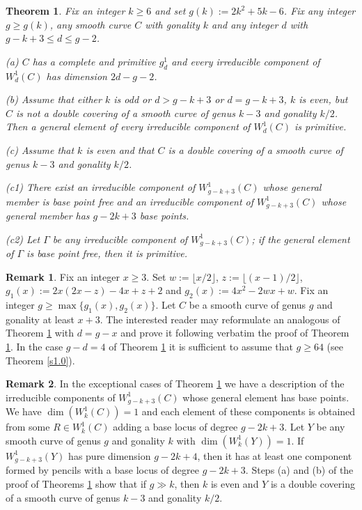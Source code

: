 \documentclass{amsart}
\theoremstyle{plain}
\newtheorem{theorem}{Theorem}
\theoremstyle{definition}
\newtheorem{remark}{Remark}
\begin{document}
\begin{theorem}\label{or1}
Fix an integer $k\ge 6$ and set $g(k):=2k^2+5k-6$. Fix any integer $g\ge g(k)$, any smooth curve $C$ with gonality $k$
and any integer $d$ with $g-k+3 \le d\le g-2$.

\quad (a) $C$ has a complete and primitive $g^1_d$ and every irreducible component of $W^1_d({C})$ has dimension $2d-g-2$.

\quad (b) Assume that either $k$ is odd or $d>g-k+3$ or $d=g-k+3$, $k$ is even, but $C$ is not a double covering of a smooth curve of genus $k-3$ and gonality $k/2$.
Then a general element of every irreducible component of $W^1_d({C})$ is primitive.


\quad ({c}) Assume that $k$ is even and that $C$ is a double covering of a smooth curve of genus $k-3$ and
gonality $k/2$.

\quad (c1) There exist an irreducible component of $W^1_{g-k+3}({C})$ whose general member
is base point free and an irreducible component of $W^1_{g-k+3}({C})$ whose general member has $g-2k+3$ base points. 

\quad (c2) Let $\Gamma$ be any irreducible component of $W^1_{g-k+3}({C})$; if the general element of $\Gamma$ is base point free, then it is primitive.\end{theorem}

\begin{remark}\label{or2}
Fix an integer $x\ge 3$. Set $w:= \lfloor x/2\rfloor$, $z:= \lfloor (x-1)/2\rfloor$, $g_1(x):= 2x(2x-z)-4x+z+2$ and $g_2(x):= 4x^2-2wx+w$. Fix an integer $g\ge \max \{g_1(x),g_2(x)\}$.
Let $C$ be a smooth curve of genus $g$ and gonality at least $x+3$. The interested reader may reformulate an analogous of Theorem \ref{or1} with $d =g-x$
and prove it following verbatim the proof of Theorem \ref{or1}. In the case $g-d=4$ of Theorem \ref{or1} it is sufficient to assume that $g\ge 64$ (see Theorem \ref{s1.0}).
\end{remark}


\begin{remark}\label{or3}
In the exceptional cases of Theorem \ref{or1} we have a description of the irreducible components of $W^1_{g-k+3}({C})$ whose general
element has base points. We have
$\dim (W^1_k({C}))=1$ and each element of these components is obtained from some $R\in W^1_k({C})$ adding a base locus of degree $g-2k+3$. 
Let $Y$ be any smooth curve of genus $g$ and gonality $k$ with $\dim (W^1_k({Y}))=1$. If $W^1_{g-k+3}(Y)$ has pure dimension
$g-2k+4$, then it has at least one component formed by pencils with a base locus of degree $g-2k+3$. Steps (a) and (b) of the proof of Theorems \ref{or1}
show that if $g\gg k$, then $k$ is even and $Y$ is a double covering of a smooth curve of genus $k-3$ and gonality $k/2$.
\end{remark}
\end{document}
